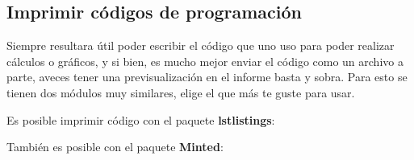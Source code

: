 \documentclass[11pt,letterpaper]{article}
\begin{document}
\begin{multicols}{2}

\subsection*{Imprimir códigos de programación}
Siempre resultara útil poder escribir el código que uno uso para poder realizar cálculos o gráficos, y si bien, es mucho mejor enviar el código como un archivo a parte, aveces tener una previsualización en el informe basta y sobra. Para esto se tienen dos módulos muy similares, elige el que más te guste para usar.\par
\end{multicols}
Es posible imprimir código con el paquete \textbf{lstlistings}:

\newpage
También es posible con el paquete \textbf{Minted}:
\begin{mdframed}[backgroundcolor=backcolour]
    \inputminted[]{python}{code.py}
\end{mdframed}
\end{document}
